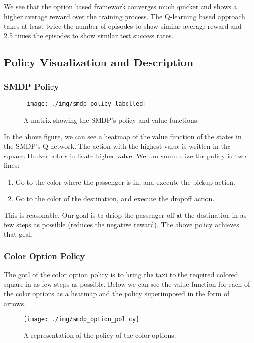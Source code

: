 \documentclass[A4]{article}
\begin{document}
    We see that the option based framework converges much quicker and shows a higher average reward over the training process.
    The Q-learning based approach takes at least twice the number of episodes to show similar average reward
    and 2.5 times the episodes to show similar test success rates.

    \subsection{Policy Visualization and Description}

    \subsubsection{SMDP Policy}
    \begin{figure}[H]
        \centering
        \texttt{[image: ./img/smdp\_policy\_labelled]}
        \caption{A matrix showing the SMDP's policy and value functions.}\label{fig:smdp_policy}
    \end{figure}

    In the above figure, we can see a heatmap of the value function of the states in the SMDP's Q-network.
    The action with the highest value is written in the square.
    Darker colors indicate higher value.
    We can summarize the policy in two lines:
    \begin{enumerate}
        \item Go to the color where the passenger is in, and execute the pickup action.
        \item Go to the color of the destination, and execute the dropoff action.
    \end{enumerate}

    This is reasonable.
    Our goal is to driop the passenger off at the destination in as few steps as possible (reduces the negative reward).
    The above policy achieves that goal.

    \subsubsection{Color Option Policy}
    The goal of the color option policy is to bring the taxi to the required colored square in as few steps as possible.
    Below we can see the value function for each of the color options as a heatmap and the policy superimposed in the form of arrows.

    \begin{figure}[H]
        \centering
        \texttt{[image: ./img/smdp\_option\_policy]}
        \caption{A representation of the policy of the color-options.}\label{fig:smdp_option_policy}
    \end{figure}
\end{document}
